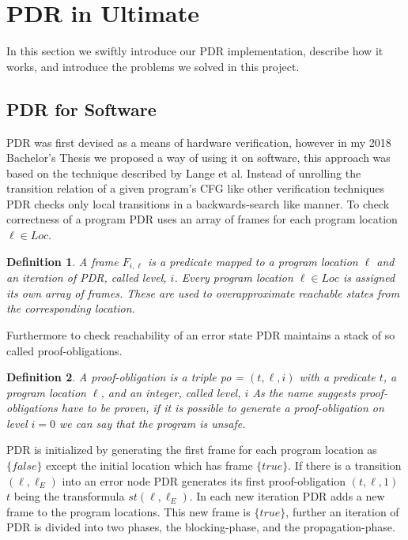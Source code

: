 \documentclass{article}
\newtheorem{mydef}{Definition}
\begin{document}
	\section{PDR in Ultimate}
	In this section we swiftly introduce our PDR implementation, describe how it works, and introduce the problems we solved in this project.
	
	\subsection{PDR for Software}
	PDR was first devised as a means of hardware verification, however in my 2018 Bachelor's Thesis we proposed a way of using it on software, this approach was based on the technique described by Lange et al. \cite{DBLP:conf/fmcad/0001NN15}
	Instead of unrolling the transition relation of a given program's CFG like other verification techniques PDR checks only local transitions in a backwards-search like manner.
	\smallskip
	To check correctness of a program PDR uses an array of frames for each program location $\ell \in Loc$. 
	\begin{mydef}
		A frame $F_{i,\ell}$ is a predicate mapped to a program location $\ell$ and an iteration of PDR, called level, $i$.
		Every program location $\ell \in Loc$ is assigned its own array of frames. These are used to overapproximate reachable states from the corresponding location.
	\end{mydef}
	Furthermore to check reachability of an error state PDR maintains a stack of so called proof-obligations.
	\begin{mydef}
		A proof-obligation is a triple po = $(t, \ell, i)$ with a predicate $t$, a program location $\ell$, and an integer, called level, $i$
		As the name suggests proof-obligations have to be proven, if it is possible to generate a proof-obligation on level $i = 0$ we can say that the program is unsafe.
	\end{mydef}
	PDR is initialized by generating the first frame for each program location as $\{ false \}$ except the initial location which has frame $\{ true \}$. If there is a transition $(\ell, \ell_E)$ into an error node PDR generates its first proof-obligation $(t, \ell, 1)$ $t$ being the transformula $st(\ell, \ell_E)$.
	In each new iteration PDR adds a new frame to the program locations. This new frame is $\{true\}$, further
	an iteration of PDR is divided into two phases, the blocking-phase, and the propagation-phase.
	
\end{document}
